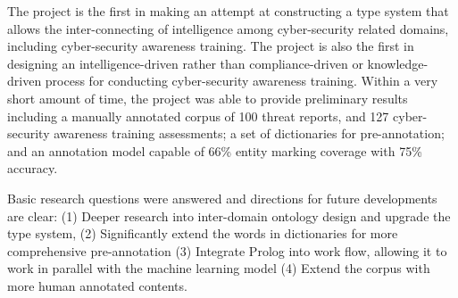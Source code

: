 \documentclass{article} %
\begin{document}
The project is the first in making an attempt at constructing a type system that allows the inter-connecting of intelligence among cyber-security related domains, including cyber-security awareness training. The project is also the first in designing an intelligence-driven rather than compliance-driven or knowledge-driven process for conducting cyber-security awareness training. Within a very short amount of time, the project was able to provide preliminary results including a manually annotated corpus of 100 threat reports, and 127 cyber-security awareness training assessments; a set of dictionaries for pre-annotation; and an annotation model capable of 66\% entity marking coverage with 75\% accuracy.

Basic research questions were answered and directions for future developments are clear: (1) Deeper research into inter-domain ontology design and upgrade the type system, (2) Significantly extend the words in dictionaries for more comprehensive pre-annotation (3) Integrate Prolog into work flow, allowing it to work in parallel with the machine learning model (4) Extend the corpus with more human annotated contents.



\end{document}
